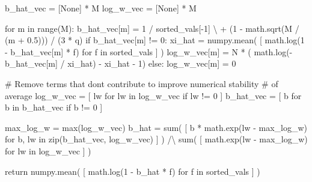 \documentclass[
  letterpaper,
  DIV=11,
  numbers=noendperiod]{scrartcl}
\newenvironment{Shaded}{\begin{snugshade}}{\end{snugshade}}
\newcommand{\BuiltInTok}[1]{\textcolor[rgb]{0.00,0.23,0.31}{#1}}
\newcommand{\CommentTok}[1]{\textcolor[rgb]{0.37,0.37,0.37}{#1}}
\newcommand{\ControlFlowTok}[1]{\textcolor[rgb]{0.00,0.23,0.31}{#1}}
\newcommand{\DecValTok}[1]{\textcolor[rgb]{0.68,0.00,0.00}{#1}}
\newcommand{\FloatTok}[1]{\textcolor[rgb]{0.68,0.00,0.00}{#1}}
\newcommand{\KeywordTok}[1]{\textcolor[rgb]{0.00,0.23,0.31}{#1}}
\newcommand{\NormalTok}[1]{\textcolor[rgb]{0.00,0.23,0.31}{#1}}
\newcommand{\OperatorTok}[1]{\textcolor[rgb]{0.37,0.37,0.37}{#1}}
\newcommand{\VariableTok}[1]{\textcolor[rgb]{0.07,0.07,0.07}{#1}}
\begin{document}
\begin{Shaded}
\begin{Highlighting}[]
\NormalTok{  b\_hat\_vec }\OperatorTok{=}\NormalTok{ [}\VariableTok{None}\NormalTok{] }\OperatorTok{*}\NormalTok{ M}
\NormalTok{  log\_w\_vec }\OperatorTok{=}\NormalTok{ [}\VariableTok{None}\NormalTok{] }\OperatorTok{*}\NormalTok{ M}

  \ControlFlowTok{for}\NormalTok{ m }\KeywordTok{in} \BuiltInTok{range}\NormalTok{(M):}
\NormalTok{    b\_hat\_vec[m] }\OperatorTok{=}   \DecValTok{1} \OperatorTok{/}\NormalTok{ sorted\_vals[}\OperatorTok{{-}}\DecValTok{1}\NormalTok{] }\OperatorTok{\textbackslash{}}
                   \OperatorTok{+}\NormalTok{ (}\DecValTok{1} \OperatorTok{{-}}\NormalTok{ math.sqrt(M }\OperatorTok{/}\NormalTok{ (m }\OperatorTok{+} \FloatTok{0.5}\NormalTok{))) }\OperatorTok{/}\NormalTok{ (}\DecValTok{3} \OperatorTok{*}\NormalTok{ q)}
    \ControlFlowTok{if}\NormalTok{ b\_hat\_vec[m] }\OperatorTok{!=} \DecValTok{0}\NormalTok{:}
\NormalTok{      xi\_hat }\OperatorTok{=}\NormalTok{ numpy.mean( [ math.log(}\DecValTok{1} \OperatorTok{{-}}\NormalTok{ b\_hat\_vec[m] }\OperatorTok{*}\NormalTok{ f)}
                             \ControlFlowTok{for}\NormalTok{ f }\KeywordTok{in}\NormalTok{ sorted\_vals ] )}
\NormalTok{      log\_w\_vec[m] }\OperatorTok{=}\NormalTok{ N }\OperatorTok{*}\NormalTok{ (   math.log(}\OperatorTok{{-}}\NormalTok{b\_hat\_vec[m] }\OperatorTok{/}\NormalTok{ xi\_hat)}
                           \OperatorTok{{-}}\NormalTok{ xi\_hat }\OperatorTok{{-}} \DecValTok{1}\NormalTok{)}
    \ControlFlowTok{else}\NormalTok{:}
\NormalTok{      log\_w\_vec[m] }\OperatorTok{=} \DecValTok{0}

  \CommentTok{\# Remove terms that don\textquotesingle{}t contribute to improve numerical stability}
  \CommentTok{\# of average}
\NormalTok{  log\_w\_vec }\OperatorTok{=}\NormalTok{ [ lw }\ControlFlowTok{for}\NormalTok{ lw }\KeywordTok{in}\NormalTok{ log\_w\_vec }\ControlFlowTok{if}\NormalTok{ lw }\OperatorTok{!=} \DecValTok{0}\NormalTok{ ]}
\NormalTok{  b\_hat\_vec }\OperatorTok{=}\NormalTok{ [ b }\ControlFlowTok{for}\NormalTok{ b }\KeywordTok{in}\NormalTok{ b\_hat\_vec }\ControlFlowTok{if}\NormalTok{ b }\OperatorTok{!=} \DecValTok{0}\NormalTok{ ]}

\NormalTok{  max\_log\_w }\OperatorTok{=} \BuiltInTok{max}\NormalTok{(log\_w\_vec)}
\NormalTok{  b\_hat }\OperatorTok{=} \BuiltInTok{sum}\NormalTok{( [ b }\OperatorTok{*}\NormalTok{ math.exp(lw }\OperatorTok{{-}}\NormalTok{ max\_log\_w)}
               \ControlFlowTok{for}\NormalTok{ b, lw }\KeywordTok{in} \BuiltInTok{zip}\NormalTok{(b\_hat\_vec, log\_w\_vec) ] ) }\OperatorTok{/\textbackslash{}}
          \BuiltInTok{sum}\NormalTok{( [ math.exp(lw }\OperatorTok{{-}}\NormalTok{ max\_log\_w) }\ControlFlowTok{for}\NormalTok{ lw }\KeywordTok{in}\NormalTok{ log\_w\_vec ] )}

  \ControlFlowTok{return}\NormalTok{ numpy.mean( [ math.log(}\DecValTok{1} \OperatorTok{{-}}\NormalTok{ b\_hat }\OperatorTok{*}\NormalTok{ f) }\ControlFlowTok{for}\NormalTok{ f }\KeywordTok{in}\NormalTok{ sorted\_vals ] )}
\end{Highlighting}
\end{Shaded}
\end{document}
